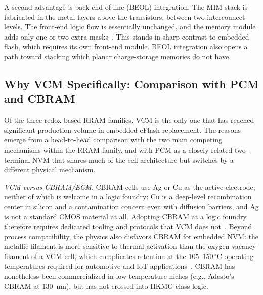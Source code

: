 \documentclass[lettersize,journal]{IEEEtran}
\begin{document}
A second advantage is back-end-of-line (BEOL) integration. The MIM stack is fabricated in the metal layers above the transistors, between two interconnect levels. The front-end logic flow is essentially unchanged, and the memory module adds only one or two extra masks~\cite{ref_wong2012}. This stands in sharp contrast to embedded flash, which requires its own front-end module. BEOL integration also opens a path toward stacking which planar charge-storage memories do not have.

\subsection{Why VCM Specifically: Comparison with PCM and CBRAM}\label{sec:why_vcm}
Of the three redox-based RRAM families, VCM is the only one that has reached significant production volume in embedded eFlash replacement. The reasons emerge from a head-to-head comparison with the two main competing mechanisms within the RRAM family, and with PCM as a closely related two-terminal NVM that shares much of the cell architecture but switches by a different physical mechanism.

\textit{VCM versus CBRAM/ECM.} CBRAM cells use Ag or Cu as the active electrode, neither of which is welcome in a logic foundry: Cu is a deep-level recombination center in silicon and a contamination concern even with diffusion barriers, and Ag is not a standard CMOS material at all. Adopting CBRAM at a logic foundry therefore requires dedicated tooling and protocols that VCM does not~\cite{ref_waser2009,ref_wong2012}. Beyond process compatibility, the physics also disfavors CBRAM for embedded NVM: the metallic filament is more sensitive to thermal activation than the oxygen-vacancy filament of a VCM cell, which complicates retention at the 105--150\,$^\circ$C operating temperatures required for automotive and IoT applications~\cite{ref_waser2009,ref_ielmini2016}. CBRAM has nonetheless been commercialized in low-temperature niches (e.g., Adesto's CBRAM at 130~nm), but has not crossed into HKMG-class logic.
\end{document}
